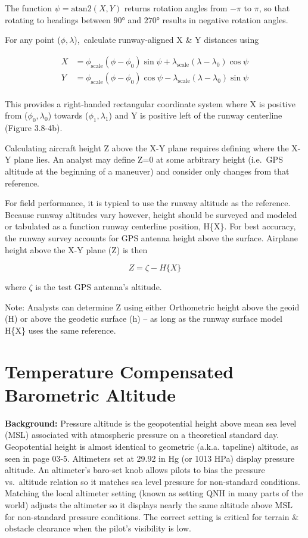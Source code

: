 \documentclass[
]{book}
\begin{document}
The function \(\psi = \mathrm{atan2} \left( X,Y \right)\) returns rotation angles from \(-\pi\) to \(\pi\), so that rotating to headings between \(90°\) and \(270°\) results in negative rotation angles.

For any point (\(\phi, \lambda\)),~calculate runway-aligned X \& Y distances using

\begin{align}
X &= \phi_{\mathrm{scale}} \left(\phi - \phi_0 \right)\sin{\psi} + \lambda_{\mathrm{scale}} \left(\lambda - \lambda_0 \right)\cos{\psi} \\
Y &= \phi_{\mathrm{scale}} \left(\phi - \phi_0 \right)\cos{\psi} - \lambda_{\mathrm{scale}} \left(\lambda - \lambda_0 \right)\sin{\psi} \\
\end{align}

This provides a right-handed rectangular coordinate system where X is positive from (\(\phi_0, \lambda_0\)) towards (\(\phi_1, \lambda_1\)) and Y is positive left of the runway centerline (Figure 3.8-4b).

Calculating aircraft height Z above the X-Y plane requires defining where the X-Y plane lies. An analyst may define Z=0 at some arbitrary height (i.e.~GPS altitude at the beginning of a maneuver) and consider only changes from that reference.

For field performance, it is typical to use the runway altitude as the reference. Because runway altitudes vary however, height should be surveyed and modeled or tabulated as a function runway centerline position, H\{X\}. For best accuracy, the runway survey accounts for GPS antenna height above the surface. Airplane height above the X-Y plane (Z) is then

\[Z = \zeta - H\{X\}\]

where \(\zeta\) is the test GPS antenna's altitude.

Note: Analysts can determine Z using either Orthometric height above the geoid (H) or above the geodetic surface (h) -- as long as the runway surface model H\{X\} uses the same reference.

\hypertarget{temperature-compensated-barometric-altitude}{%
\section{Temperature Compensated Barometric Altitude}\label{temperature-compensated-barometric-altitude}}

\textbf{Background:} Pressure altitude is the geopotential height above mean sea level (MSL) associated with atmospheric pressure on a theoretical standard day. Geopotential height is almost identical to geometric (a.k.a. tapeline) altitude, as seen in page 03-5. Altimeters set at 29.92 in Hg (or 1013 HPa) display pressure altitude. An altimeter's baro-set knob allows pilots to bias the pressure vs.~altitude relation so it matches sea level pressure for non-standard conditions. Matching the local altimeter setting (known as setting QNH in many parts of the world) adjusts the altimeter so it displays nearly the same altitude above MSL for non-standard pressure conditions. The correct setting is critical for terrain \& obstacle clearance when the pilot's visibility is low.
\end{document}
